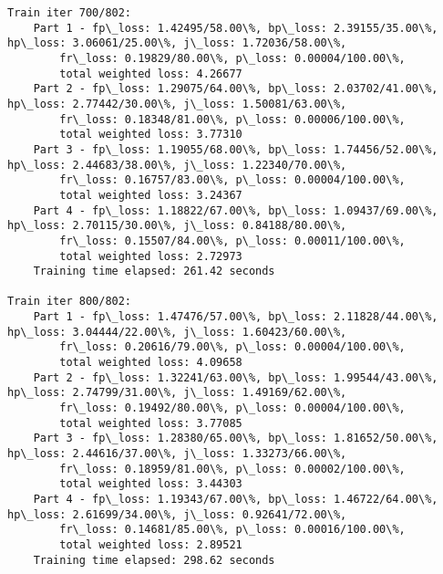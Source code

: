 \documentclass[11pt]{article}
\begin{document}
\begin{Verbatim}[commandchars=\\\{\}]
Train iter 700/802:
	Part 1 - fp\_loss: 1.42495/58.00\%, bp\_loss: 2.39155/35.00\%, hp\_loss: 3.06061/25.00\%, j\_loss: 1.72036/58.00\%, 
		fr\_loss: 0.19829/80.00\%, p\_loss: 0.00004/100.00\%, 
		total weighted loss: 4.26677
	Part 2 - fp\_loss: 1.29075/64.00\%, bp\_loss: 2.03702/41.00\%, hp\_loss: 2.77442/30.00\%, j\_loss: 1.50081/63.00\%, 
		fr\_loss: 0.18348/81.00\%, p\_loss: 0.00006/100.00\%, 
		total weighted loss: 3.77310
	Part 3 - fp\_loss: 1.19055/68.00\%, bp\_loss: 1.74456/52.00\%, hp\_loss: 2.44683/38.00\%, j\_loss: 1.22340/70.00\%, 
		fr\_loss: 0.16757/83.00\%, p\_loss: 0.00004/100.00\%, 
		total weighted loss: 3.24367
	Part 4 - fp\_loss: 1.18822/67.00\%, bp\_loss: 1.09437/69.00\%, hp\_loss: 2.70115/30.00\%, j\_loss: 0.84188/80.00\%, 
		fr\_loss: 0.15507/84.00\%, p\_loss: 0.00011/100.00\%, 
		total weighted loss: 2.72973
	Training time elapsed: 261.42 seconds

Train iter 800/802:
	Part 1 - fp\_loss: 1.47476/57.00\%, bp\_loss: 2.11828/44.00\%, hp\_loss: 3.04444/22.00\%, j\_loss: 1.60423/60.00\%, 
		fr\_loss: 0.20616/79.00\%, p\_loss: 0.00004/100.00\%, 
		total weighted loss: 4.09658
	Part 2 - fp\_loss: 1.32241/63.00\%, bp\_loss: 1.99544/43.00\%, hp\_loss: 2.74799/31.00\%, j\_loss: 1.49169/62.00\%, 
		fr\_loss: 0.19492/80.00\%, p\_loss: 0.00004/100.00\%, 
		total weighted loss: 3.77085
	Part 3 - fp\_loss: 1.28380/65.00\%, bp\_loss: 1.81652/50.00\%, hp\_loss: 2.44616/37.00\%, j\_loss: 1.33273/66.00\%, 
		fr\_loss: 0.18959/81.00\%, p\_loss: 0.00002/100.00\%, 
		total weighted loss: 3.44303
	Part 4 - fp\_loss: 1.19343/67.00\%, bp\_loss: 1.46722/64.00\%, hp\_loss: 2.61699/34.00\%, j\_loss: 0.92641/72.00\%, 
		fr\_loss: 0.14681/85.00\%, p\_loss: 0.00016/100.00\%, 
		total weighted loss: 2.89521
	Training time elapsed: 298.62 seconds


\end{Verbatim}
\end{document}
